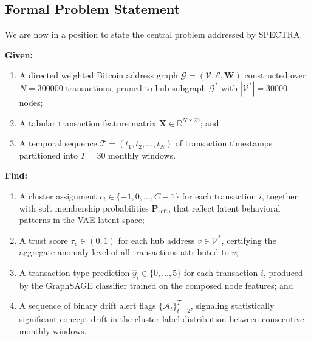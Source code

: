 \subsection{Formal Problem Statement}
\label{subsec:problem}

We are now in a position to state the central problem addressed by SPECTRA.

\begin{mdframed}[linewidth=0.8pt, innertopmargin=8pt, innerbottommargin=8pt,
                 innerleftmargin=10pt, innerrightmargin=10pt]
\begin{problem}
\label{prob:spectra}
\textbf{Given:}
\begin{enumerate}
  \item A directed weighted Bitcoin address graph
        $\mathcal{G}=(\mathcal{V},\mathcal{E},\mathbf{W})$
        constructed over $N=\num{300000}$ transactions, pruned to
        hub subgraph $\mathcal{G}^{*}$ with $|\mathcal{V}^{*}|=\num{30000}$
        nodes;
  \item A tabular transaction feature matrix
        $\mathbf{X}\in\mathbb{R}^{N\times 20}$; and
  \item A temporal sequence $\mathcal{T} = (t_{1}, t_{2}, \ldots, t_{N})$
        of transaction timestamps partitioned into $T=30$ monthly windows.
\end{enumerate}

\medskip
\textbf{Find:}
\begin{enumerate}
  \item[\textbf{(F1)}] A cluster assignment
        $c_{i}\in\{-1,0,\ldots,C-1\}$ for each transaction $i$, together
        with soft membership probabilities $\mathbf{P}_{\mathrm{soft}}$,
        that reflect latent behavioral patterns in the VAE latent space;
  \item[\textbf{(F2)}] A trust score $\tau_{v}\in(0,1)$ for each hub address
        $v\in\mathcal{V}^{*}$, certifying the aggregate anomaly level of
        all transactions attributed to $v$;
  \item[\textbf{(F3)}] A transaction-type prediction
        $\hat{y}_{i}\in\{0,\ldots,5\}$ for each transaction $i$, produced
        by the GraphSAGE classifier trained on the composed node features;
        and
  \item[\textbf{(F4)}] A sequence of binary drift alert flags
        $\{\mathcal{A}_{t}\}_{t=2}^{T}$, signaling statistically significant
        concept drift in the cluster-label distribution between consecutive
        monthly windows.
\end{enumerate}


\end{problem}
\end{mdframed}
